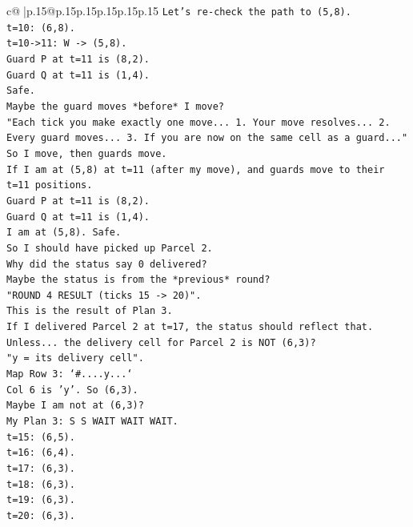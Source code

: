 \documentclass{article}
\begin{document}
{\begin{supertabular}{c@{$\;$}|p{.15\linewidth}@{}p{.15\linewidth}p{.15\linewidth}p{.15\linewidth}p{.15\linewidth}p{.15\linewidth}}
{{{\texttt{Let's re{-}check the path to (5,8).} \\
\texttt{t=10: (6,8).} \\
\texttt{t=10{-}>11: W {-}> (5,8).} \\
\texttt{Guard P at t=11 is (8,2).} \\
\texttt{Guard Q at t=11 is (1,4).} \\
\texttt{Safe.} \\
\texttt{Maybe the guard moves *before* I move?} \\
\texttt{"Each tick you make exactly one move... 1. Your move resolves... 2. Every guard moves... 3. If you are now on the same cell as a guard..."} \\
\texttt{So I move, then guards move.} \\
\texttt{If I am at (5,8) at t=11 (after my move), and guards move to their t=11 positions.} \\
\texttt{Guard P at t=11 is (8,2).} \\
\texttt{Guard Q at t=11 is (1,4).} \\
\texttt{I am at (5,8). Safe.} \\
\texttt{So I should have picked up Parcel 2.} \\
\texttt{Why did the status say 0 delivered?} \\
\texttt{Maybe the status is from the *previous* round?} \\
\texttt{"ROUND 4 RESULT (ticks 15 {-}> 20)".} \\
\texttt{This is the result of Plan 3.} \\
\texttt{If I delivered Parcel 2 at t=17, the status should reflect that.} \\
\texttt{Unless... the delivery cell for Parcel 2 is NOT (6,3)?} \\
\texttt{"y = its delivery cell".} \\
\texttt{Map Row 3: `\#....y...`} \\
\texttt{Col 6 is 'y'. So (6,3).} \\
\texttt{Maybe I am not at (6,3)?} \\
\texttt{My Plan 3: S S WAIT WAIT WAIT.} \\
\texttt{t=15: (6,5).} \\
\texttt{t=16: (6,4).} \\
\texttt{t=17: (6,3).} \\
\texttt{t=18: (6,3).} \\
\texttt{t=19: (6,3).} \\
\texttt{t=20: (6,3).} \\
}}}
\end{supertabular}}
\end{document}
